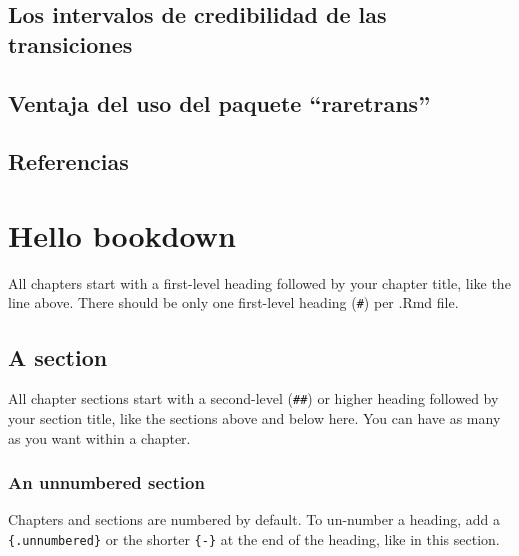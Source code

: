\documentclass[
]{book}
\theoremstyle{definition}
\theoremstyle{definition}
\theoremstyle{definition}
\theoremstyle{definition}
\theoremstyle{remark}
\begin{document}
\hypertarget{los-intervalos-de-credibilidad-de-las-transiciones}{%
\section{Los intervalos de credibilidad de las transiciones}\label{los-intervalos-de-credibilidad-de-las-transiciones}}

\hypertarget{ventaja-del-uso-del-paquete-raretrans}{%
\section{Ventaja del uso del paquete ``raretrans''}\label{ventaja-del-uso-del-paquete-raretrans}}

\hypertarget{referencias-4}{%
\section{Referencias}\label{referencias-4}}

\hypertarget{hello-bookdown}{%
\chapter{Hello bookdown}\label{hello-bookdown}}

All chapters start with a first-level heading followed by your chapter title, like the line above. There should be only one first-level heading (\texttt{\#}) per .Rmd file.

\hypertarget{a-section}{%
\section{A section}\label{a-section}}

All chapter sections start with a second-level (\texttt{\#\#}) or higher heading followed by your section title, like the sections above and below here. You can have as many as you want within a chapter.

\hypertarget{an-unnumbered-section}{%
\subsection*{An unnumbered section}\label{an-unnumbered-section}}

Chapters and sections are numbered by default. To un-number a heading, add a \texttt{\{.unnumbered\}} or the shorter \texttt{\{-\}} at the end of the heading, like in this section.
\end{document}
